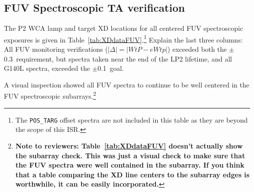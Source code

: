 \subsection{FUV Spectroscopic TA verification}\label{subsec:FspVER}
The P2 WCA lamp and target XD locations for all centered FUV spectroscopic exposures is given in Table~\ref{tab:XDdataFUV}.\footnote{The \texttt{POS\_TARG} offset spectra are not included in this table as
they are beyond the scope of this ISR.}
Explain the last three columns:
All FUV monitoring verifications ($|\Delta| = |WtP-eWtp|$) exceeded both the $\pm$0.3\arcsec\ requirement,
but spectra taken near the end of the LP2 lifetime, and all G140L spectra, exceeded the $\pm$0.1\arcsec\ goal.

A visual inspection showed all FUV spectra to continue to be well centered in the FUV spectroscopic subarrays.\footnote{\bf Note to reviewers:  Table~\ref{tab:XDdataFUV} doesn't actually show the subarray check. This was just a visual check to
make sure that the FUV spectra were well contained in the subarray. If you think that a table comparing the XD line centers to
the subarray edges is worthwhile, it can be easily incorporated.}\\


